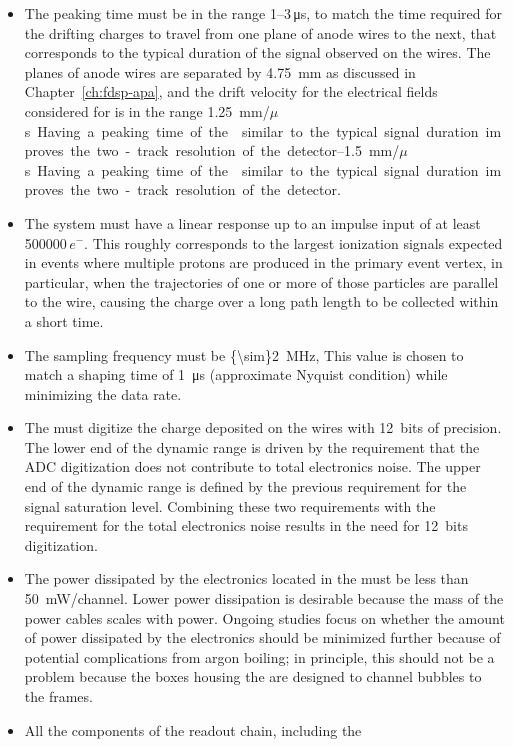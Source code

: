 \begin{itemize}
\item{The  peaking time must be in the range \numrange{1}{3}\,\si{\micro\second},
to match the time required for the drifting charges to travel from one plane of anode
wires to the next, that corresponds to the typical duration of the signal observed
on the wires. The planes of anode wires are separated by \SI{4.75}{mm}
as discussed in Chapter~\ref{ch:fdsp-apa}, and the drift velocity for
the electrical fields considered for  is in the range
\SIrange{1.25}{1.5}{mm/$\mu$s}. Having a peaking time of the 
similar to the typical signal duration improves the two-track resolution of
the detector.}
\item{The system must have a linear response up to an impulse input of 
at least \num{500000}\,$e^{-}$.  This roughly corresponds to the largest 
ionization signals expected in events where multiple protons are produced 
in the primary event vertex, in particular, when the trajectories of one 
or more of those particles are parallel to the wire, causing the charge 
over a long path length to be collected within a short time.}
\item{The  sampling frequency must be \SI{{\sim}2}{MHz},
This value is chosen to match a  shaping time of \SI{1}{\micro\second} 
(approximate Nyquist condition) while minimizing the data rate.}
\item{The  must digitize the charge deposited on the wires 
with 12~bits of precision.  The lower end of the  dynamic 
range is driven by the requirement that the ADC digitization does not 
contribute to total electronics noise. The upper end of the  
dynamic range is defined by the previous requirement for the signal 
saturation level. Combining these two requirements with the requirement 
for the total electronics noise results in the need for 12~bits digitization.}
\item{The power dissipated by the electronics located in the  must
be less than \SI{50}{mW/channel}.  Lower power dissipation is desirable 
because the mass of the power cables scales with  power. Ongoing studies 
focus on whether the amount of power dissipated by the electronics 
should be minimized further because of potential complications from 
argon boiling; in principle, this should not be a problem because the 
 boxes housing the  are designed to channel 
bubbles to the  frames.}
\item{All the components of the readout chain, including the 
}
\end{itemize}

